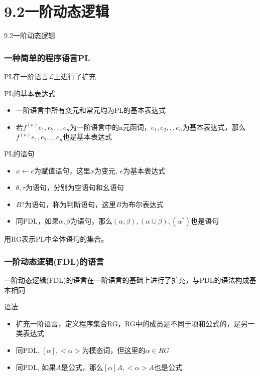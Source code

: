 \documentclass{beamer}
\begin{document}
\section{9.2一阶动态逻辑}

\begin{frame}
	\begin{center}
		\item 9.2一阶动态逻辑
	\end{center}
\end{frame}



\begin{frame}
	\frametitle{一种简单的程序语言PL}
	PL在一阶语言$\mathcal{L}$上进行了扩充
	\begin{block}{PL的基本表达式}
		\begin{itemize}
	    	\item 一阶语言中所有变元和常元均为PL的基本表达式
	    	\item 若$f^{(n)} e_1, e_2 ,,, e_n$为一阶语言中的n元函词，$e_1, e_2 ,,, e_n$为基本表达式，那么$f^{(n)} e_1, e_2 ,,, e_n$也是基本表达式
		\end{itemize}
	\end{block}
	\begin{block}{PL的语句}
		\begin{itemize}
			\item $x \leftarrow e$为赋值语句，这里$x$为变元, $e$为基本表达式
			\item $\theta, \tau$为语句，分别为空语句和幺语句
			\item $B?$为语句，称为判断语句，这里$B$为布尔表达式
			\item 同PDL，如果$\alpha, \beta$为语句，那么$(\alpha ; \beta), (\alpha \cup \beta), (\alpha ^{*})$也是语句
		\end{itemize}
	\end{block}
	用RG表示PL中全体语句的集合。
\end{frame}




\begin{frame}
	\frametitle{一阶动态逻辑(FDL)的语言}
	一阶动态逻辑(FDL)的语言在一阶语言的基础上进行了扩充，与PDL的语法构成基本相同
	\begin{block}{语法}
		\begin{itemize}
	    	\item 扩充一阶语言，定义程序集合RG，RG中的成员是不同于项和公式的，是另一类表达式
	    	\item 同PDL, $[\alpha], <\alpha>$为模态词，但这里的$\alpha \in RG$
	    	\item 同PDL, 如果$A$是公式，那么$[\alpha]A, <\alpha>A$也是公式
		\end{itemize}
	\end{block}
\end{frame}
\end{document}
